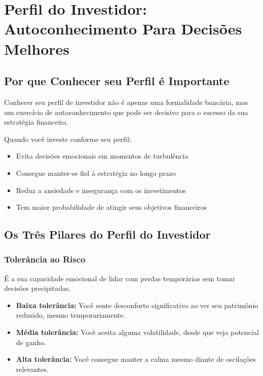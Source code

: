 \chapter{Perfil do Investidor: Autoconhecimento Para Decisões Melhores}

\section{Por que Conhecer seu Perfil é Importante}

\noindent Conhecer seu perfil de investidor não é apenas uma formalidade bancária, mas um exercício de autoconhecimento que pode ser decisivo para o sucesso da sua estratégia financeira.

\vspace{0.3cm}
\noindent Quando você investe conforme seu perfil:
\begin{itemize}[leftmargin=*]
    \item Evita decisões emocionais em momentos de turbulência
    \item Consegue manter-se fiel à estratégia no longo prazo
    \item Reduz a ansiedade e insegurança com os investimentos
    \item Tem maior probabilidade de atingir seus objetivos financeiros
\end{itemize}

\section{Os Três Pilares do Perfil do Investidor}

\subsection{Tolerância ao Risco}
\noindent É a sua capacidade emocional de lidar com perdas temporárias sem tomar decisões precipitadas.

\begin{itemize}[leftmargin=*]
    \item \textbf{Baixa tolerância:} Você sente desconforto significativo ao ver seu patrimônio reduzido, mesmo temporariamente.
    \item \textbf{Média tolerância:} Você aceita alguma volatilidade, desde que veja potencial de ganho.
    \item \textbf{Alta tolerância:} Você consegue manter a calma mesmo diante de oscilações relevantes.
\end{itemize}

